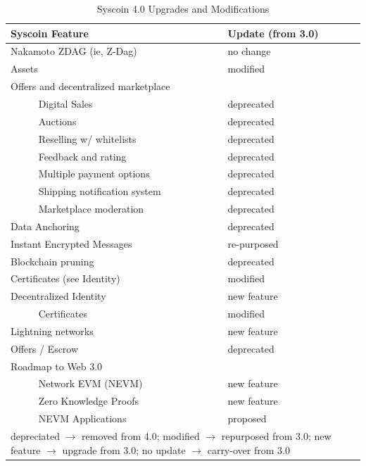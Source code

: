 \documentclass[peerreview]{ieeesyscoin}
\begin{document}
\begin{table}[h!]
\caption{Syscoin 4.0 Upgrades and Modifications}
\label{table:ugrades}
\setlength{\tabcolsep}{3pt}
\begin{tabular}{|p{135pt}|p{75pt}|}
\hline
Syscoin Feature & 
Update (from 3.0) \\

\hline
Nakamoto ZDAG (ie, Z-Dag) & no change \\
Assets & modified \\

Offers and decentralized marketplace &   \\
~~~~~ Digital Sales &  deprecated \\
~~~~~ Auctions &  deprecated \\
~~~~~ Reselling w/ whitelists &  deprecated \\
~~~~~ Feedback and rating &  deprecated \\
~~~~~ Multiple payment options &  deprecated \\
~~~~~ Shipping notification system &  deprecated \\
~~~~~ Marketplace moderation &  deprecated \\

Data Anchoring &  deprecated \\
Instant Encrypted Messages &  re-purposed \\
Blockchain pruning &  deprecated \\
Certificates (see Identity) &  modified \\
Decentralized Identity &  new feature \\
~~~~~ Certificates &  modified \\
Lightning networks &  new feature \\
Offers / Escrow &  deprecated \\
Roadmap to Web 3.0 & \\
~~~~~ Network EVM (NEVM) &  new feature  \\
~~~~~ Zero Knowledge Proofs &  new feature \\
~~~~~ NEVM Applications &  proposed \\

\hline
\multicolumn{2}{p{251pt}}{depreciated  $\rightarrow$ removed from 4.0; modified  $\rightarrow$ repurposed from 3.0; new feature  $\rightarrow$ upgrade from 3.0; no update $\rightarrow$ carry-over from 3.0}\\

\end{tabular}
\label{tab1}
\end{table}
\end{document}
